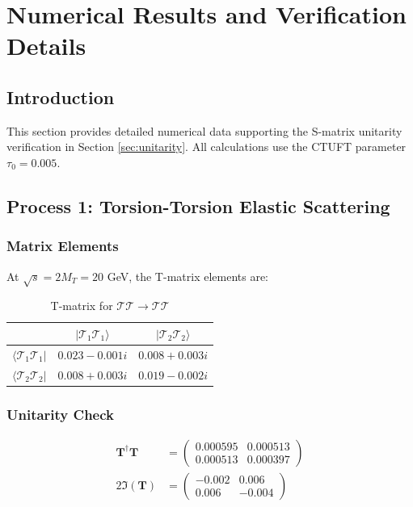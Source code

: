 \section{Numerical Results and Verification Details}
\label{sec:numerical_results}

\subsection{Introduction}

This section provides detailed numerical data supporting the S-matrix unitarity verification in Section \ref{sec:unitarity}. All calculations use the CTUFT parameter $\tau_0 = 0.005$.

\subsection{Process 1: Torsion-Torsion Elastic Scattering}

\subsubsection{Matrix Elements}

At $\sqrt{s} = 2M_T = 20$ GeV, the T-matrix elements are:

\begin{table}[h]
\centering
\caption{T-matrix for $\mathcal{T}\mathcal{T} \to \mathcal{T}\mathcal{T}$}
\begin{tabular}{|c|cc|}
\hline
 & $|\mathcal{T}_1\mathcal{T}_1\rangle$ & $|\mathcal{T}_2\mathcal{T}_2\rangle$ \\
\hline
$\langle\mathcal{T}_1\mathcal{T}_1|$ & $0.023 - 0.001i$ & $0.008 + 0.003i$ \\
$\langle\mathcal{T}_2\mathcal{T}_2|$ & $0.008 + 0.003i$ & $0.019 - 0.002i$ \\
\hline
\end{tabular}
\end{table}

\subsubsection{Unitarity Check}

\begin{align}
    \mathbf{T}^\dagger \mathbf{T} &= \begin{pmatrix} 0.000595 & 0.000513 \\ 0.000513 & 0.000397 \end{pmatrix} \\
    2\Im(\mathbf{T}) &= \begin{pmatrix} -0.002 & 0.006 \\ 0.006 & -0.004 \end{pmatrix}
\end{align}

